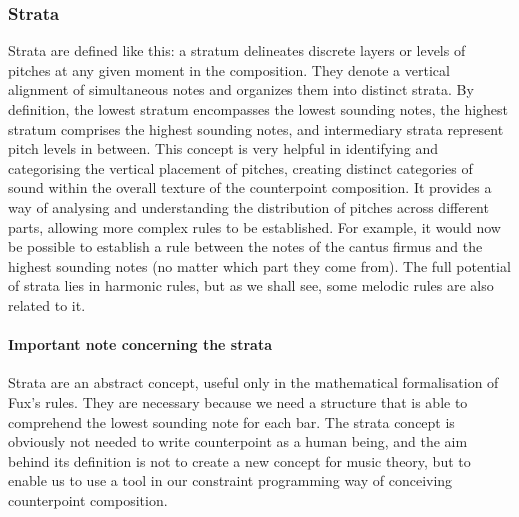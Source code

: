 \subsubsection{Strata}
Strata are defined like this: a stratum delineates discrete layers or levels of pitches at any given moment in the composition. They denote a vertical alignment of simultaneous notes and organizes them into distinct strata. By definition, the lowest stratum encompasses the lowest sounding notes, the highest stratum comprises the highest sounding notes, and intermediary strata represent pitch levels in between.
This concept is very helpful in identifying and categorising the vertical placement of pitches, creating distinct categories of sound within the overall texture of the counterpoint composition. It provides a way of analysing and understanding the distribution of pitches across different parts, allowing more complex rules to be established. For example, it would now be possible to establish a rule between the notes of the cantus firmus and the highest sounding notes (no matter which part they come from). The full potential of strata lies in harmonic rules, but as we shall see, some melodic rules are also related to it.

\paragraph*{Important note concerning the strata}
Strata are an abstract concept, useful only in the mathematical formalisation of Fux's rules. They are necessary because we need a structure that is able to comprehend the lowest sounding note for each bar. The strata concept is obviously not needed to write counterpoint as a human being, and the aim behind its definition is not to create a new concept for music theory, but to enable us to use a tool in our constraint programming way of conceiving counterpoint composition.


